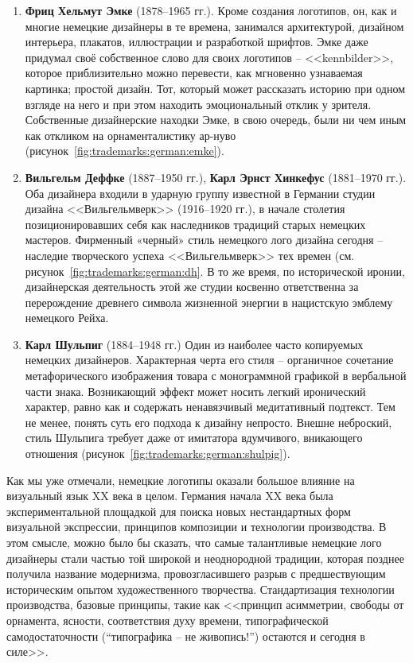 \begin{enumerate}
\item \textbf{Фриц Хельмут Эмке} (1878--1965 гг.). Кроме создания логотипов, он, как и многие
  немецкие дизайнеры в те времена, занимался архитектурой, дизайном интерьера, плакатов, иллюстрации
  и разработкой шрифтов. Эмке даже придумал своё собственное слово для своих логотипов --
  <<kennbilder>>, которое приблизительно можно перевести, как мгновенно узнаваемая картинка; простой
  дизайн. Тот, который может рассказать историю при одном взгляде на него и при этом находить
  эмоциональный отклик у зрителя. Собственные дизайнерские находки Эмке, в свою очередь, были ни чем
  иным как откликом на орнаменталистику ар-нуво (рисунок~\ref{fig:trademarks:german:emke}).
\item \textbf{Вильгельм Деффке} (1887--1950 гг.), \textbf{Карл Эрнст Хинкефус} (1881--1970 гг.). Оба
  дизайнера входили в ударную группу известной в Германии студии дизайна <<Вильгельмверк>> (1916--1920
  гг.), в начале столетия позиционировавших себя как наследников традиций старых немецких
  мастеров. Фирменный «черный» стиль немецкого лого дизайна сегодня -- наследие творческого успеха
  <<Вильгельмверк>> тех времен (см. рисунок~\ref{fig:trademarks:german:dh}. В то же время, по
  исторической иронии, дизайнерская деятельность этой же студии косвенно ответственна за перерождение
  древнего символа жизненной энергии в нацистскую эмблему немецкого Рейха.
\item \textbf{Карл Шульпиг} (1884--1948 гг.) Один из наиболее часто копируемых немецких
  дизайнеров. Характерная черта его стиля -- органичное сочетание метафорического изображения товара
  с монограммной графикой в вербальной части знака. Возникающий эффект может носить легкий
  иронический характер, равно как и содержать ненавязчивый медитативный подтекст. Тем не менее,
  понять суть его подхода к дизайну непросто. Внешне неброский, стиль Шульпига требует даже от
  имитатора вдумчивого, вникающего отношения (рисунок~\ref{fig:trademarks:german:shulpig}).
\end{enumerate}

Как мы уже отмечали, немецкие логотипы оказали большое влияние на визуальный язык XX века в целом. Германия начала XX века была экспериментальной площадкой для поиска новых нестандартных форм визуальной экспрессии,
принципов композиции и технологии производства. В этом смысле, можно было бы сказать, что самые
талантливые немецкие лого дизайнеры стали частью той широкой и неоднородной традиции, которая
позднее получила название модернизма, провозгласившего разрыв с предшествующим историческим опытом
художественного творчества. Стандартизация технологии производства, базовые принципы, такие как
<<принцип асимметрии, свободы от орнамента, ясности, соответствия духу времени, типографической
самодостаточности (``типографика – не живопись!'') остаются и сегодня в силе>>\autocite[][8]{chihold2011}.

